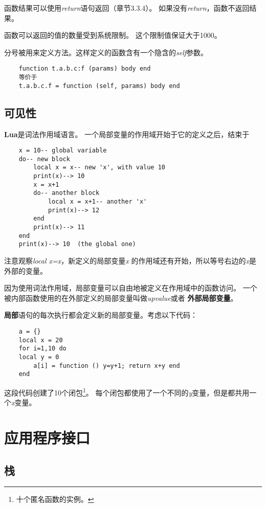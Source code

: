 \documentclass{ctexart}
\begin{document}
函数结果可以使用\emph{return}语句返回（章节3.3.4）。
如果没有\emph{return}，函数不返回结果。

函数可以返回的值的数量受到系统限制。
这个限制值保证大于1000。

分号被用来定义方法。这样定义的函数含有一个隐含的\emph{self}参数。

\lstset{language=C}
\begin{lstlisting}
	function t.a.b.c:f (params) body end
	等价于
	t.a.b.c.f = function (self, params) body end
\end{lstlisting}

\subsection{可见性}

\textbf{Lua}是词法作用域语言。
一个局部变量的作用域开始于它的定义之后，结束于

\lstset{language=C}
\begin{lstlisting}
	x = 10-- global variable
	do-- new block
		local x = x-- new 'x', with value 10
		print(x)--> 10
		x = x+1
		do-- another block
			local x = x+1-- another 'x'
			print(x)--> 12
		end
		print(x)--> 11
	end
	print(x)--> 10  (the global one)
\end{lstlisting}

注意观察\emph{local x=x}，新定义的局部变量\emph{x}
的作用域还有开始，所以等号右边的\emph{x}是外部的变量。

因为使用词法作用域，局部变量可以自由地被定义在作用域中的函数访问。
一个被内部函数使用的在外部定义的局部变量叫做\emph{upvalue}或者
\textbf{外部局部变量}。

\textbf{局部}语句的每次执行都会定义新的局部变量。考虑以下代码：

\lstset{language=C}
\begin{lstlisting}
	a = {}
	local x = 20
	for i=1,10 do
	local y = 0
		a[i] = function () y=y+1; return x+y end
	end
\end{lstlisting}

这段代码创建了10个闭包\footnote{十个匿名函数的实例。}。
每个闭包都使用了一个不同的\emph{y}变量，但是都共用一个\emph{x}变量。

\section{应用程序接口}

\subsection{栈}
\end{document}

